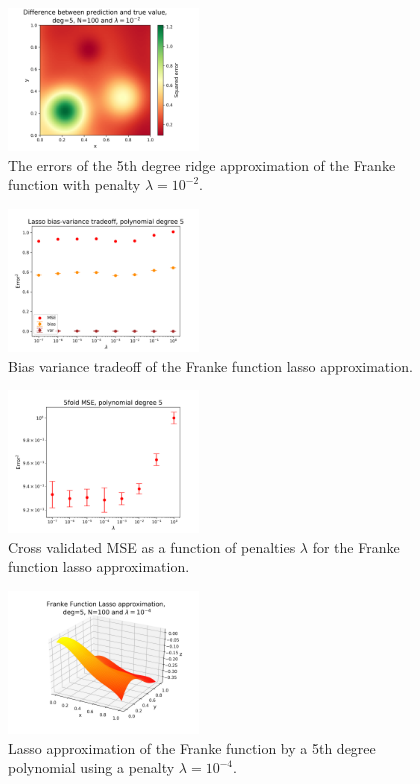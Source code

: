 \documentclass[notitlepage, reprint, nofootinbib]{revtex4-1}
\begin{document}
\begin{figure}
 	\centering
  	\includegraphics[width=0.45\textwidth]{../Figures/franke_ridge_error_deg5_N100.png}
  	\caption{The errors of the 5th degree ridge approximation of the Franke function with penalty $\lambda=10^{-2}$.}
	\label{fig9}
\end{figure}

\begin{figure}
	\centering
	\includegraphics[width=0.45\textwidth]{../Figures/lasso_bias_variance_deg5.png}
	\caption{Bias variance tradeoff of the Franke function lasso approximation.}
	\label{fig10}
\end{figure}

\begin{figure}
	\centering
	\includegraphics[width=0.45\textwidth]{../Figures/lasso_kfold_deg5.png}
	\caption{Cross validated MSE as a function of penalties $\lambda$ for the Franke function lasso approximation.}
	\label{fig11}
\end{figure}

\begin{figure}
 	\centering
	\includegraphics[width=0.45\textwidth]{../Figures/franke_lasso_deg5_N100.png}
  	\caption{Lasso approximation of the Franke function by a 5th degree polynomial using a penalty $\lambda=10^{-4}$.}
	\label{fig12}
\end{figure}
\end{document}
